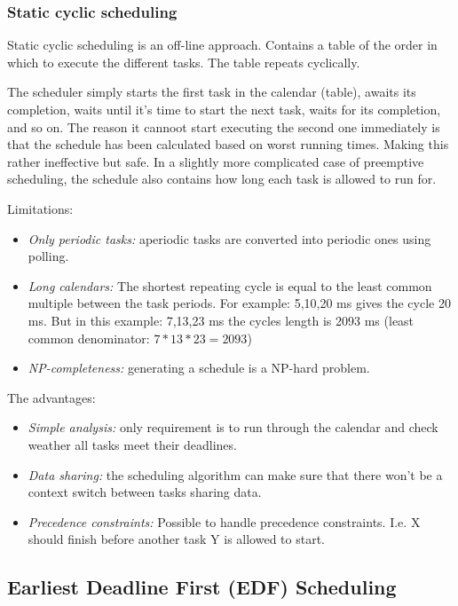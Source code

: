 \documentclass[a4paper]{article}
\begin{document}
\subsubsection{Static cyclic scheduling}
Static cyclic scheduling is an off-line approach. Contains a table of the order
in which to execute the different tasks. The table repeats cyclically.

The scheduler simply starts the first task in the calendar (table), awaits its
completion, waits until it's time to start the next task, waits for its
completion, and so on. The reason it cannoot start executing the second one
immediately is that the schedule has been calculated based on worst running
times. Making this rather ineffective but safe. In a slightly more complicated
case of preemptive scheduling, the schedule also contains how long each task is
allowed to run for.

Limitations:
\begin{itemize}
  \item \emph{Only periodic tasks:} aperiodic tasks are converted into periodic
        ones using polling.
  \item \emph{Long calendars:} The shortest repeating cycle is equal to the least
        common multiple between the task periods. For example: 5,10,20 ms gives
        the cycle 20 ms. But in this example: 7,13,23 ms the cycles length is
        2093 ms (least common denominator: $7*13*23=2093$)
  \item \emph{NP-completeness:} generating a schedule is a NP-hard problem.
\end{itemize}

The advantages:
\begin{itemize}
  \item \emph{Simple analysis:} only requirement is to run through the calendar
        and check weather all tasks meet their deadlines.
  \item \emph{Data sharing:} the scheduling algorithm can make sure that there
        won't be a context switch between tasks sharing data.
  \item \emph{Precedence constraints:} Possible to handle precedence constraints.
        I.e. X should finish before another task Y is allowed to start.
\end{itemize}

\subsection{Earliest Deadline First (EDF) Scheduling}
\end{document}
